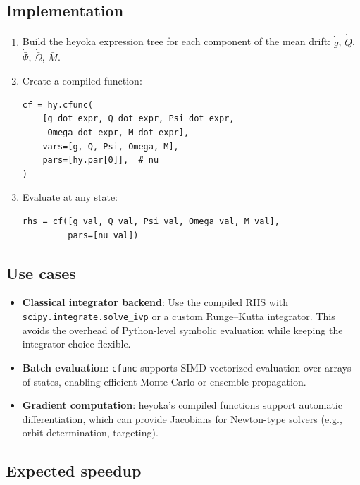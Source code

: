 \documentclass[11pt]{article}
\begin{document}
\subsection{Implementation}

\begin{enumerate}
\item Build the heyoka expression tree for each component of the mean drift:
$\dot{\bar g}$, $\dot{\bar Q}$, $\dot{\bar\Psi}$, $\dot{\bar\Omega}$,
$\dot{\bar M}$.

\item Create a compiled function:
\begin{verbatim}
cf = hy.cfunc(
    [g_dot_expr, Q_dot_expr, Psi_dot_expr,
     Omega_dot_expr, M_dot_expr],
    vars=[g, Q, Psi, Omega, M],
    pars=[hy.par[0]],  # nu
)
\end{verbatim}

\item Evaluate at any state:
\begin{verbatim}
rhs = cf([g_val, Q_val, Psi_val, Omega_val, M_val],
         pars=[nu_val])
\end{verbatim}
\end{enumerate}

\subsection{Use cases}

\begin{itemize}
\item \textbf{Classical integrator backend}: Use the compiled RHS with
\texttt{scipy.integrate.solve\_ivp} or a custom Runge--Kutta integrator.
This avoids the overhead of Python-level symbolic evaluation while keeping
the integrator choice flexible.

\item \textbf{Batch evaluation}: \texttt{cfunc} supports SIMD-vectorized
evaluation over arrays of states, enabling efficient Monte Carlo or ensemble
propagation.

\item \textbf{Gradient computation}: heyoka's compiled functions support
automatic differentiation, which can provide Jacobians for
Newton-type solvers (e.g., orbit determination, targeting).
\end{itemize}

\subsection{Expected speedup}
\end{document}
